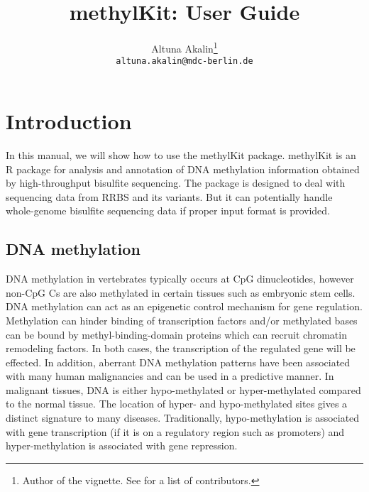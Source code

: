 \documentclass{article}
\title{ methylKit: User Guide}
\begin{document}


\author{Altuna Akalin\thanks{Author of the vignette. See  for a list of contributors.}\\ 
\texttt{altuna.akalin@mdc-berlin.de}
}





\maketitle

\tableofcontents



\section{Introduction}
In this manual, we will show how to use the methylKit package. methylKit is an R package for analysis and annotation of DNA methylation information obtained by high-throughput bisulfite sequencing. The package is designed to deal with sequencing data from RRBS and its variants. But it can potentially handle whole-genome bisulfite sequencing data if proper input format is provided. 

\subsection{DNA methylation}
DNA methylation in vertebrates typically occurs at CpG dinucleotides, however non-CpG Cs are also methylated in certain tissues such as embryonic stem cells. DNA methylation can act as an epigenetic control mechanism for gene regulation. Methylation can hinder binding of transcription factors and/or methylated bases can be bound by methyl-binding-domain proteins which can recruit chromatin remodeling factors. In both cases, the transcription of the regulated gene will be effected. In addition, aberrant DNA methylation patterns have been associated with many human malignancies and can be used in a predictive manner. In malignant tissues, DNA is either hypo-methylated or hyper-methylated compared to the normal tissue. The location of hyper- and hypo-methylated sites gives a distinct signature to many diseases. Traditionally, hypo-methylation is associated with gene transcription (if it is on a regulatory region such as promoters) and hyper-methylation is associated with gene repression.
\end{document}
